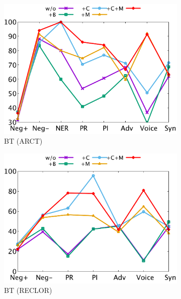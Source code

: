 \begin{figure}[th]
\begin{subfigure}[b]{0.24\textwidth}
\includegraphics[width=\columnwidth]{data/arct_bert.pdf}
\caption{BT (ARCT)}
\label{fig:arct_bert}
\end{subfigure}
\hfill
\begin{subfigure}[b]{0.24\textwidth}
\centering
\includegraphics[width=\columnwidth]{data/reclor_bert.pdf}
\caption{BT (RECLOR)}
\label{fig:reclor_bert}
\end{subfigure}
\hfill
\newpage
\begin{subfigure}[b]{0.24\textwidth}
\centering

\end{subfigure}
\end{figure}
